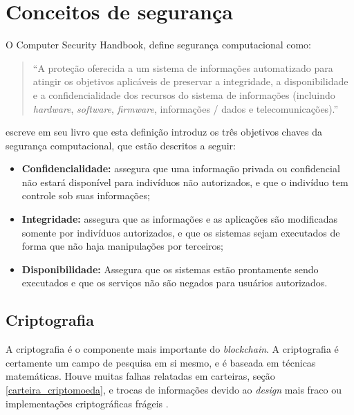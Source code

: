 \section{Conceitos de segurança}

    O Computer Security Handbook\cite{nist95}, define segurança computacional como:
    
     \begin{quote}
        ``A proteção oferecida a um sistema de informações automatizado para atingir os objetivos aplicáveis de preservar a integridade, a disponibilidade e a confidencialidade dos recursos do sistema de informações (incluindo \textit{hardware}, \textit{software}, \textit{firmware}, informações / dados e telecomunicações).''
     \end{quote}
     
      \citeauthor{cryptograpy_and_network_stallings}  escreve em seu livro que esta definição introduz os três objetivos chaves da segurança computacional, que estão descritos a seguir:
        
        \begin{itemize}
            \item \textbf{Confidencialidade:} assegura que uma informação privada ou confidencial não estará disponível para indivíduos não autorizados, e que o indivíduo tem controle sob suas informações;
            \item \textbf{Integridade:} assegura que as informações e as aplicações são modificadas somente por indivíduos autorizados, e que os sistemas sejam executados de forma que não haja manipulações por terceiros;
            \item \textbf{Disponibilidade:} Assegura que os sistemas estão prontamente sendo executados e que os serviços não são negados para usuários autorizados.
        \end{itemize}

    \subsection{Criptografia}
    
    A criptografia é o componente mais importante do \textit{blockchain}. A criptografia é certamente um campo de pesquisa em si mesmo, e é baseada em técnicas matemáticas. Houve muitas falhas relatadas em carteiras, seção \ref{carteira_criptomoeda}, e trocas de informações devido ao \textit{design} mais fraco ou implementações criptográficas frágeis \cite{beginnig_blockchain_bikramaditya}.
    

